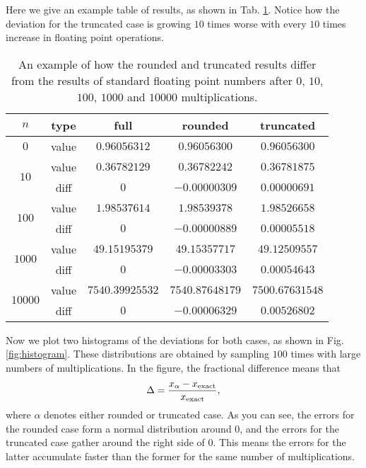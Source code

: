 Here we give an example table of results, as shown in Tab. \ref{tab:compare}. Notice how the
deviation for the truncated case is growing \(10\) times worse with every \(10\) times increase
in floating point operations.

\begin{table}
    \centering
    \caption{An example of how the rounded and truncated results differ from the results of
        standard floating point numbers after \(0\), \(10\), \(100\), \(1000\) and \(10000\)
        multiplications.}
    \label{tab:compare}
    \begin{tabular}{@{}ccccc@{}}
        \toprule
        \(n\)                      & type  & full              & rounded           & truncated         \\
        \midrule
        \(0\)                      & value & \(0.96056312\)    & \(0.96056300\)    & \(0.96056300\)    \\
        \cmidrule{1-2}
        \multirow{2}{*}{\(10\)}    & value & \(0.36782129\)    & \(0.36782242\)    & \(0.36781875\)    \\
                                   & diff  & \(0\)             & \(-0.00000309\)   & \(0.00000691\)    \\
        \cmidrule{1-2}
        \multirow{2}{*}{\(100\)}   & value & \(1.98537614\)    & \(1.98539378\)    & \(1.98526658\)    \\
                                   & diff  & \(0\)             & \(-0.00000889\)   & \(0.00005518\)    \\
        \cmidrule{1-2}
        \multirow{2}{*}{\(1000\)}  & value & \(49.15195379\)   & \(49.15357717\)   & \(49.12509557\)   \\
                                   & diff  & \(0\)             & \(-0.00003303\)   & \(0.00054643\)    \\
        \cmidrule{1-2}
        \multirow{2}{*}{\(10000\)} & value & \(7540.39925532\) & \(7540.87648179\) & \(7500.67631548\) \\
                                   & diff  & \(0\)             & \(-0.00006329\)   & \(0.00526802\)    \\
        \bottomrule
    \end{tabular}
\end{table}

Now we plot two histograms of the deviations for both cases, as shown in
Fig. \ref{fig:histogram}.
These distributions are obtained by sampling \(100\) times with
large numbers of multiplications.
In the figure, the fractional difference means that
%
\begin{equation}
    \Delta = \frac{x_{\alpha} - x_\textnormal{exact}}{x_\textnormal{exact}},
\end{equation}
%
where \(\alpha\) denotes either rounded or truncated case.
As you can see, the errors for the rounded case form a normal distribution around
\(0\), and the errors for the truncated case gather around the right side of \(0\).
This means the errors for the latter accumulate faster than the former for the same
number of multiplications.

